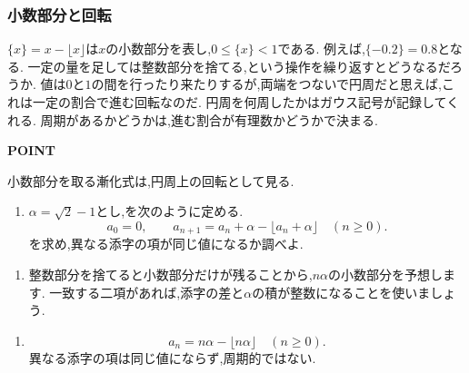 \subsubsection{小数部分と回転}\label{節：小数部分と回転}
$\{x\}=x-\lfloor x\rfloor$は$x$の小数部分を表し,$0\le\{x\}<1$である.
例えば,$\{-0.2\}=0.8$となる.
一定の量を足しては整数部分を捨てる,という操作を繰り返すとどうなるだろうか.
値は$0$と$1$の間を行ったり来たりするが,両端をつないで円周だと思えば,これは一定の割合で進む回転なのだ.
円周を何周したかはガウス記号が記録してくれる.
周期があるかどうかは,進む割合が有理数かどうかで決まる.

\begin{bookpoint}
  \textbf{POINT}\par
  小数部分を取る漸化式は,円周上の回転として見る.
\end{bookpoint}

\noindent {}\par\nobreak
\begin{enumerate}[label=(\arabic*),parsep=3pt,beginpenalty=10000,format=\bookitemlink{example-gauss-role-9}{problem}{answer}]
  \item $\alpha=\sqrt2-1$とし,を次のように定める.
    \[
      a_0=0,\qquad
      a_{n+1}=a_n+\alpha-\lfloor a_n+\alpha\rfloor
      \quad(n\ge0).
    \]
    を求め,異なる添字の項が同じ値になるか調べよ.
\end{enumerate}

\noindent {}\par\nobreak
\begin{enumerate}[label=(\arabic*),parsep=3pt,beginpenalty=10000,format=\bookitemlink{example-gauss-role-9}{hint}{problem}]
  \item 整数部分を捨てると小数部分だけが残ることから,$n\alpha$の小数部分を予想します.
    一致する二項があれば,添字の差と$\alpha$の積が整数になることを使いましょう.
\end{enumerate}

\noindent {}\par\nobreak
\begin{enumerate}[label=(\arabic*),parsep=3pt,beginpenalty=10000,format=\bookitemlink{example-gauss-role-9}{answer}{problem}]
  \item \[
      a_n=n\alpha-\lfloor n\alpha\rfloor\quad(n\ge0).
    \]
    異なる添字の項は同じ値にならず,周期的ではない.
\end{enumerate}

